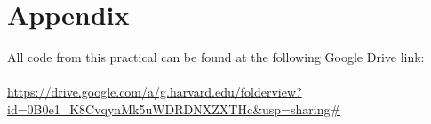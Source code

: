 \documentclass{article}
\begin{document}
\section*{Appendix}
\fontsize{7pt}{7pt}\selectfont
All code from this practical can be found at the following Google Drive link: \\ \\ \url{https://drive.google.com/a/g.harvard.edu/folderview?id=0B0e1_K8CvqynMk5uWDRDNXZXTHc&usp=sharing#} \\ \\
\end{document}
